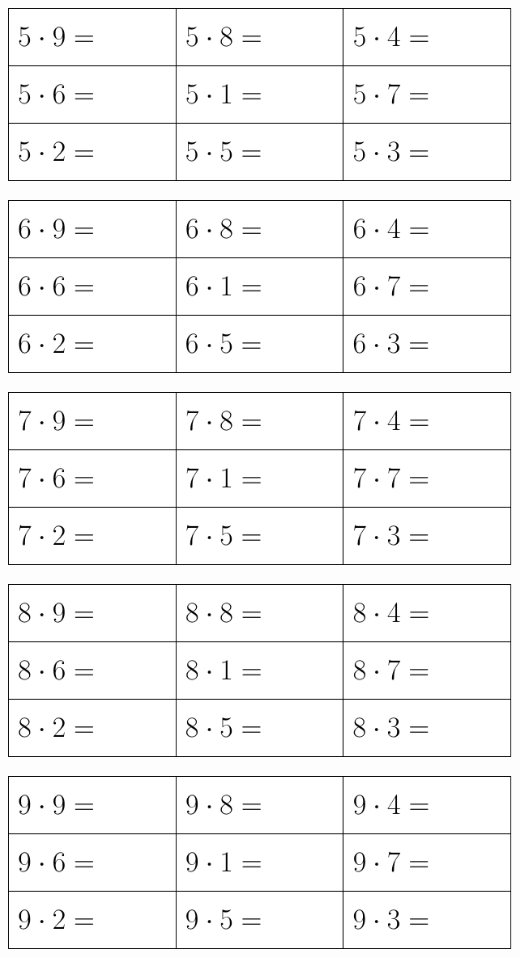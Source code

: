\begin{center}
	\includegraphics{g5}
\end{center}
\newpage
\thispagestyle{empty}
\begin{center}
	\includegraphics{g6}
\end{center}
\vspace{10pt}
\begin{center}
	\includegraphics{g7}
\end{center}
\vspace{10pt}
\begin{center}
	\includegraphics{g8}
\end{center}
\vspace{10pt}
\begin{center}
	\includegraphics{g9}
\end{center}
